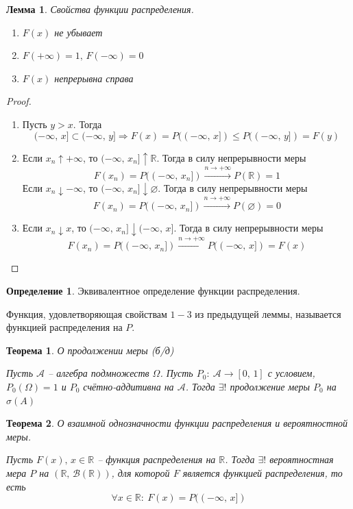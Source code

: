 \documentclass[a4paper,12pt]{article}
\renewcommand{\leq}{\ensuremath{\leqslant}}
\renewcommand{\emptyset}{\ensuremath{\varnothing}}
\theoremstyle{plain}
\newtheorem{theorem}{Теорема}[section]
\newtheorem{lemma}{Лемма}[section]
\theoremstyle{definition}
\newtheorem{definition}{Определение}[section]
\theoremstyle{remark}
\begin{document}
\begin{lemma}
	Свойства функции распределения.

	\begin{enumerate}
		\item $F(x)$ не убывает
		\item $F(+\infty) = 1,\, F(-\infty) = 0$
		\item $F(x)$ непрерывна справа
	\end{enumerate}
\end{lemma}

\begin{proof}
	\begin{enumerate}
		\item Пусть $y > x$. Тогда
		      \[(-\infty,\, x] \subset (-\infty,\, y] \Rightarrow F(x) = P((-\infty,\, x]) \leq P((-\infty,\, y]) = F(y)\]
		\item Если $x_n \uparrow +\infty$, то $(-\infty,\, x_n] \uparrow \mathbb{R}$. Тогда в силу непрерывности меры
		      \[F(x_n) = P((-\infty,\, x_n]) \stackrel{n \to +\infty}{\to} P(\mathbb{R}) = 1\]
		      Если $x_n \downarrow -\infty$, то $(-\infty,\, x_n] \downarrow \emptyset$. Тогда в силу непрерывности меры
		      \[F(x_n) = P((-\infty,\, x_n]) \stackrel{n \to +\infty}{\to} P(\emptyset) = 0\]
		\item Если $x_n \downarrow x$, то $(-\infty,\, x_n] \downarrow (-\infty,\, x]$. Тогда в силу непрерывности меры
		      \[F(x_n) = P((-\infty,\, x_n]) \stackrel{n \to +\infty}{\to} P((-\infty,\, x]) = F(x)\]
	\end{enumerate}
\end{proof}

\begin{definition}
	Эквивалентное определение функции распределения.

	Функция, удовлетворяющая свойствам $1-3$ из предыдущей леммы, называется функцией распределения на $P$.
\end{definition}

\begin{theorem} \label{MEASURE_EXTEND_TH}
	О продолжении меры (б/д)

	Пусть $\mathcal{A}$ -- алгебра подмножеств $\Omega$. Пусть $P_0 :\: \mathcal{A} \to [0,\,1]$ с условием, $P_0(\Omega) = 1$ и $P_0$ счётно-аддитивна на $\mathcal{A}$. Тогда $\exists!$ продолжение меры $P_0$ на $\sigma(A)$
\end{theorem}

\begin{theorem}
	О взаимной однозначности функции распределения и вероятностной меры.

	Пусть $F(x),\, x \in \mathbb{R}$ -- функция распределения на $\mathbb{R}$. Тогда $\exists!$ вероятностная мера $P$ на $(\mathbb{R},\, \mathcal{B}(\mathbb{R}))$, для которой $F$ является функцией распределения, то есть
	\[\forall x \in \mathbb{R} :\: F(x) = P((-\infty,\,x])\]
\end{theorem}
\end{document}
